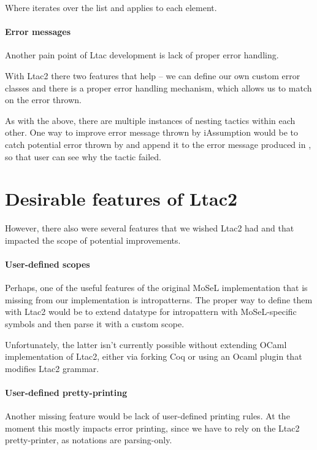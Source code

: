 Where  iterates over the list and applies  to each element.

\paragraph{Error messages}

Another pain point of Ltac development is lack of proper error handling.

With Ltac2 there two features that help -- we can define our own custom error classes and there is a proper error handling mechanism, which allows us to match on the error thrown.

As with the  above, there are multiple instances of nesting tactics within each other.
One way to improve error message thrown by iAssumption would be to catch potential error thrown by  and append it to the error message produced in , so that user can see why the tactic failed.

\section{Desirable features of Ltac2}

However, there also were several features that we wished Ltac2 had and that impacted the scope of potential improvements.

\paragraph{User-defined scopes}

Perhaps, one of the useful features of the original MoSeL implementation that is missing from our implementation is intropatterns.
The proper way to define them with Ltac2 would be to extend datatype for intropattern with MoSeL-specific symbols and then parse it with a custom scope.

Unfortunately, the latter isn't currently possible without extending OCaml implementation of Ltac2, either via forking Coq or using an Ocaml plugin that modifies Ltac2 grammar.

\paragraph{User-defined pretty-printing}
Another missing feature would be lack of user-defined printing rules.
At the moment this mostly impacts error printing, since we have to rely on the Ltac2 pretty-printer, as notations are parsing-only.


